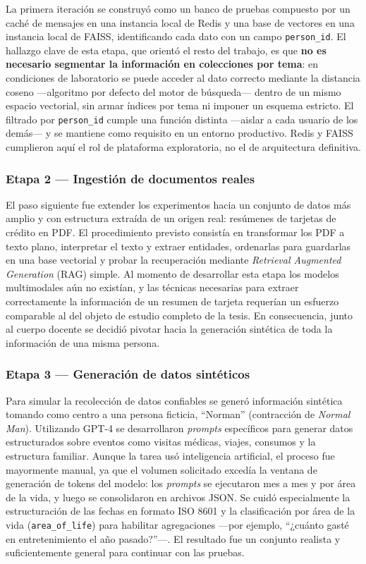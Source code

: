 La primera iteración se construyó como un banco de pruebas compuesto por un caché de mensajes en una instancia local de Redis y una base de vectores en una instancia local de FAISS, identificando cada dato con un campo \texttt{person\_id}. El hallazgo clave de esta etapa, que orientó el resto del trabajo, es que \textbf{no es necesario segmentar la información en colecciones por tema}: en condiciones de laboratorio se puede acceder al dato correcto mediante la distancia coseno —algoritmo por defecto del motor de búsqueda— dentro de un mismo espacio vectorial, sin armar índices por tema ni imponer un esquema estricto. El filtrado por \texttt{person\_id} cumple una función distinta —aislar a cada usuario de los demás— y se mantiene como requisito en un entorno productivo. Redis y FAISS cumplieron aquí el rol de plataforma exploratoria, no el de arquitectura definitiva.

\subsubsection{Etapa 2 --- Ingestión de documentos reales}

El paso siguiente fue extender los experimentos hacia un conjunto de datos más amplio y con estructura extraída de un origen real: resúmenes de tarjetas de crédito en PDF. El procedimiento previsto consistía en transformar los PDF a texto plano, interpretar el texto y extraer entidades, ordenarlas para guardarlas en una base vectorial y probar la recuperación mediante \textit{Retrieval Augmented Generation} (RAG) simple. Al momento de desarrollar esta etapa los modelos multimodales aún no existían, y las técnicas necesarias para extraer correctamente la información de un resumen de tarjeta requerían un esfuerzo comparable al del objeto de estudio completo de la tesis. En consecuencia, junto al cuerpo docente se decidió pivotar hacia la generación sintética de toda la información de una misma persona.

\subsubsection{Etapa 3 --- Generación de datos sintéticos}

Para simular la recolección de datos confiables se generó información sintética tomando como centro a una persona ficticia, ``Norman'' (contracción de \textit{Normal Man}). Utilizando GPT-4 se desarrollaron \textit{prompts} específicos para generar datos estructurados sobre eventos como visitas médicas, viajes, consumos y la estructura familiar. Aunque la tarea usó inteligencia artificial, el proceso fue mayormente manual, ya que el volumen solicitado excedía la ventana de generación de tokens del modelo: los \textit{prompts} se ejecutaron mes a mes y por área de la vida, y luego se consolidaron en archivos JSON. Se cuidó especialmente la estructuración de las fechas en formato ISO 8601 y la clasificación por área de la vida (\texttt{area\_of\_life}) para habilitar agregaciones —por ejemplo, ``¿cuánto gasté en entretenimiento el año pasado?''—. El resultado fue un conjunto realista y suficientemente general para continuar con las pruebas.

